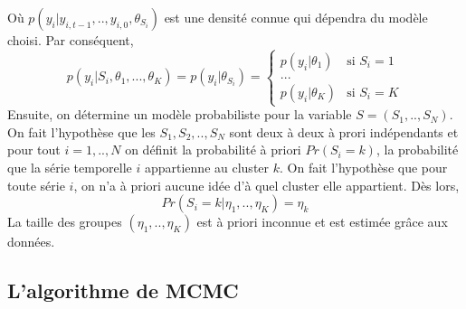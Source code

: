 Où \textit{$p(y_i|y_{i,t-1},..,y_{i,0},\theta_{S_i})$} est une densité connue qui dépendra du modèle choisi.
\newline
Par conséquent, 
\begin{equation}
\textit{$p(y_i | S_i, \theta_1,...,\theta_K) =  p(y_i | \theta_{S_i})$} = \left\{\begin{array}{ll}
  \textit{$p(y_i | \theta_{1})$}   & \mbox{si } S_i = 1  \\
  ...                                         \\
  \textit{$p(y_i | \theta_{K})$}   & \mbox{si } S_i = K
\end{array}\right.
\end{equation}
\newline
Ensuite, on détermine un modèle probabiliste pour la variable $S = (S_1,..,S_N)$. On fait l'hypothèse que les $S_1, S_2,..,S_N$ sont deux à deux à prori indépendants et pour tout $i = 1,..,N$ on définit la probabilité à priori $Pr(S_i = k)$, la probabilité que la série temporelle $i$ appartienne au cluster $k$. On fait l'hypothèse que pour toute série $i$, on n'a à priori aucune idée d'à quel cluster elle appartient. Dès lors,
\begin{equation}
Pr(S_i = k | \eta_1,..,\eta_K) = \eta_k
\end{equation}
La taille des groupes $(\eta_1,..,\eta_K)$ est à priori inconnue et est estimée grâce aux données.

\subsection{L'algorithme de MCMC}

